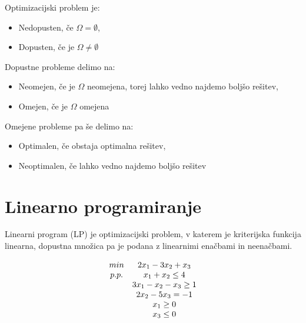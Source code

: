 \documentclass[11pt, a4paper]{article}
\begin{document}
    \par
    Optimizacijski problem je:
    \begin{itemize}
        \item Nedopusten, če \(\Omega = \emptyset\),
        \item Dopusten, če je \(\Omega \neq \emptyset\)
        
    \end{itemize}

    \par
    Dopustne probleme delimo na:
    \begin{itemize}
        \item Neomejen, če je \(\Omega\) neomejena, torej lahko vedno najdemo boljšo rešitev,
        \item Omejen, če je \(\Omega\) omejena
        
    \end{itemize}

    \par
    Omejene probleme pa še delimo na:
    \begin{itemize}
        \item Optimalen, če obstaja optimalna rešitev,
        \item Neoptimalen, če lahko vedno najdemo boljšo rešitev
    \end{itemize}



    \section{Linearno programiranje}

    \begin{definition}
        Linearni program (LP) je optimizacijski problem, v katerem je kriterijska funkcija linearna, dopustna množica pa je podana z linearnimi enačbami in neenačbami.
    \end{definition}

    \begin{example}
        \[
            \begin{array}{ c c }
                min & 2x_1-3x_2+x_3 \\
                p.p. & x_1+x_2 \le 4 \\
                & 3x_1-x_2-x_3 \ge 1 \\
                & 2x_2-5x_3 = -1 \\
                & x_1 \ge 0 \\
                & x_3 \le 0 \\
            \end{array}
        \]
    \end{example}
    
\end{document}
